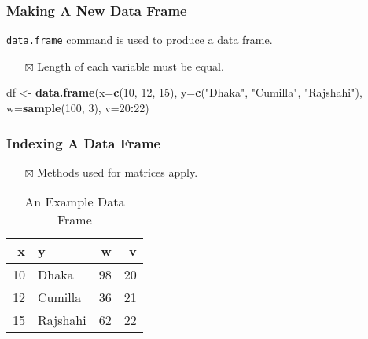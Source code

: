 \documentclass[
]{book}
\newenvironment{Shaded}{\begin{snugshade}}{\end{snugshade}}
\newcommand{\DataTypeTok}[1]{\textcolor[rgb]{0.13,0.29,0.53}{#1}}
\newcommand{\DecValTok}[1]{\textcolor[rgb]{0.00,0.00,0.81}{#1}}
\newcommand{\KeywordTok}[1]{\textcolor[rgb]{0.13,0.29,0.53}{\textbf{#1}}}
\newcommand{\NormalTok}[1]{#1}
\newcommand{\OperatorTok}[1]{\textcolor[rgb]{0.81,0.36,0.00}{\textbf{#1}}}
\newcommand{\StringTok}[1]{\textcolor[rgb]{0.31,0.60,0.02}{#1}}
\providecommand{\tightlist}{%
  \setlength{\itemsep}{0pt}\setlength{\parskip}{0pt}}
\begin{document}
\hypertarget{making-a-new-data-frame}{%
\subsubsection{Making A New Data Frame}\label{making-a-new-data-frame}}

\texttt{data.frame} command is used to produce a data frame.

\begin{itemize}
\tightlist
\item[$\boxtimes$]
  Length of each variable must be equal.
\end{itemize}

\begin{Shaded}
\begin{Highlighting}[]
\NormalTok{df <-}\StringTok{ }\KeywordTok{data.frame}\NormalTok{(}\DataTypeTok{x=}\KeywordTok{c}\NormalTok{(}\DecValTok{10}\NormalTok{, }\DecValTok{12}\NormalTok{, }\DecValTok{15}\NormalTok{),}
                 \DataTypeTok{y=}\KeywordTok{c}\NormalTok{(}\StringTok{"Dhaka"}\NormalTok{, }\StringTok{"Cumilla"}\NormalTok{, }\StringTok{"Rajshahi"}\NormalTok{),}
                 \DataTypeTok{w=}\KeywordTok{sample}\NormalTok{(}\DecValTok{100}\NormalTok{, }\DecValTok{3}\NormalTok{),}
                 \DataTypeTok{v=}\DecValTok{20}\OperatorTok{:}\DecValTok{22}\NormalTok{)}
\end{Highlighting}
\end{Shaded}

\hypertarget{indexing-a-data-frame}{%
\subsubsection{Indexing A Data Frame}\label{indexing-a-data-frame}}

\begin{itemize}
\tightlist
\item[$\boxtimes$]
  Methods used for matrices apply.
\end{itemize}

\begin{table}

\caption{\label{tab:df}An Example Data Frame}
\centering
\begin{tabular}[t]{r|l|r|r}
\hline
x & y & w & v\\
\hline
10 & Dhaka & 98 & 20\\
\hline
12 & Cumilla & 36 & 21\\
\hline
15 & Rajshahi & 62 & 22\\
\hline
\end{tabular}
\end{table}
\end{document}
